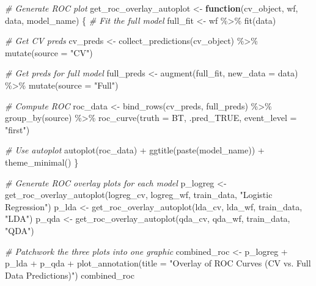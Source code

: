 \documentclass[
]{article}
\newenvironment{Shaded}{\begin{snugshade}}{\end{snugshade}}
\newcommand{\AttributeTok}[1]{\textcolor[rgb]{0.77,0.63,0.00}{#1}}
\newcommand{\CommentTok}[1]{\textcolor[rgb]{0.56,0.35,0.01}{\textit{#1}}}
\newcommand{\ControlFlowTok}[1]{\textcolor[rgb]{0.13,0.29,0.53}{\textbf{#1}}}
\newcommand{\FunctionTok}[1]{\textcolor[rgb]{0.00,0.00,0.00}{#1}}
\newcommand{\NormalTok}[1]{#1}
\newcommand{\OtherTok}[1]{\textcolor[rgb]{0.56,0.35,0.01}{#1}}
\newcommand{\SpecialCharTok}[1]{\textcolor[rgb]{0.00,0.00,0.00}{#1}}
\newcommand{\StringTok}[1]{\textcolor[rgb]{0.31,0.60,0.02}{#1}}
\begin{document}
\begin{Shaded}
\begin{Highlighting}[]
\CommentTok{\# Generate ROC plot}
\NormalTok{get\_roc\_overlay\_autoplot }\OtherTok{\textless{}{-}} \ControlFlowTok{function}\NormalTok{(cv\_object, wf, data, model\_name) \{}
  \CommentTok{\# Fit the full model}
\NormalTok{  full\_fit }\OtherTok{\textless{}{-}}\NormalTok{ wf }\SpecialCharTok{\%\textgreater{}\%} \FunctionTok{fit}\NormalTok{(data)}
  
  \CommentTok{\# Get CV preds}
\NormalTok{  cv\_preds }\OtherTok{\textless{}{-}} \FunctionTok{collect\_predictions}\NormalTok{(cv\_object) }\SpecialCharTok{\%\textgreater{}\%} 
    \FunctionTok{mutate}\NormalTok{(}\AttributeTok{source =} \StringTok{"CV"}\NormalTok{)}
  
  \CommentTok{\# Get preds for full model}
\NormalTok{  full\_preds }\OtherTok{\textless{}{-}} \FunctionTok{augment}\NormalTok{(full\_fit, }\AttributeTok{new\_data =}\NormalTok{ data) }\SpecialCharTok{\%\textgreater{}\%} 
    \FunctionTok{mutate}\NormalTok{(}\AttributeTok{source =} \StringTok{"Full"}\NormalTok{)}
  
  \CommentTok{\# Compute ROC}
\NormalTok{  roc\_data }\OtherTok{\textless{}{-}} \FunctionTok{bind\_rows}\NormalTok{(cv\_preds, full\_preds) }\SpecialCharTok{\%\textgreater{}\%}
    \FunctionTok{group\_by}\NormalTok{(source) }\SpecialCharTok{\%\textgreater{}\%}
    \FunctionTok{roc\_curve}\NormalTok{(}\AttributeTok{truth =}\NormalTok{ BT, .pred\_TRUE, }\AttributeTok{event\_level =} \StringTok{"first"}\NormalTok{)}
  
  \CommentTok{\# Use autoplot}
  \FunctionTok{autoplot}\NormalTok{(roc\_data) }\SpecialCharTok{+}
    \FunctionTok{ggtitle}\NormalTok{(}\FunctionTok{paste}\NormalTok{(model\_name)) }\SpecialCharTok{+}
    \FunctionTok{theme\_minimal}\NormalTok{()}
\NormalTok{\}}

\CommentTok{\# Generate ROC overlay plots for each model}
\NormalTok{p\_logreg }\OtherTok{\textless{}{-}} \FunctionTok{get\_roc\_overlay\_autoplot}\NormalTok{(logreg\_cv, logreg\_wf, train\_data, }\StringTok{"Logistic Regression"}\NormalTok{)}
\NormalTok{p\_lda    }\OtherTok{\textless{}{-}} \FunctionTok{get\_roc\_overlay\_autoplot}\NormalTok{(lda\_cv, lda\_wf, train\_data, }\StringTok{"LDA"}\NormalTok{)}
\NormalTok{p\_qda    }\OtherTok{\textless{}{-}} \FunctionTok{get\_roc\_overlay\_autoplot}\NormalTok{(qda\_cv, qda\_wf, train\_data, }\StringTok{"QDA"}\NormalTok{)}

\CommentTok{\# Patchwork the three plots into one graphic}
\NormalTok{combined\_roc }\OtherTok{\textless{}{-}}\NormalTok{ p\_logreg }\SpecialCharTok{+}\NormalTok{ p\_lda }\SpecialCharTok{+}\NormalTok{ p\_qda }\SpecialCharTok{+} 
  \FunctionTok{plot\_annotation}\NormalTok{(}\AttributeTok{title =} \StringTok{"Overlay of ROC Curves (CV vs. Full Data Predictions)"}\NormalTok{)}
\NormalTok{combined\_roc}
\end{Highlighting}
\end{Shaded}
\end{document}
